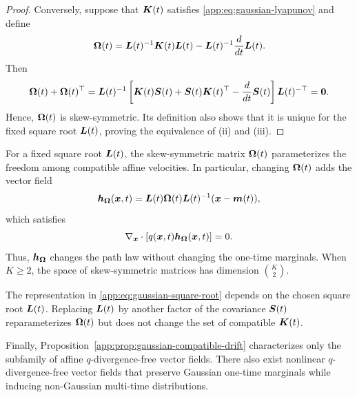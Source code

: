 \begin{proof}
Conversely, suppose that $\boldsymbol{K}(t)$ satisfies \eqref{app:eq:gaussian-lyapunov} and define
\begin{equation*}
    \boldsymbol{\Omega}(t) = \boldsymbol{L}(t)^{-1}\boldsymbol{K}(t)\boldsymbol{L}(t) - \boldsymbol{L}(t)^{-1}\frac{d}{d t}\boldsymbol{L}(t).
\end{equation*}
Then
\begin{equation*}
    \boldsymbol{\Omega}(t) + \boldsymbol{\Omega}(t)^\top  = \boldsymbol{L}(t)^{-1} \left[    \boldsymbol{K}(t)\boldsymbol{S}(t) + \boldsymbol{S}(t)\boldsymbol{K}(t)^\top - \frac{d}{d t}\boldsymbol{S}(t) \right] \boldsymbol{L}(t)^{-\top} =\boldsymbol{0}.
\end{equation*}
Hence, $\boldsymbol{\Omega}(t)$ is skew-symmetric. 
Its definition also shows that it is unique for the fixed square root $\boldsymbol{L}(t)$, proving the equivalence of (ii) and (iii).
\end{proof}

For a fixed square root $\boldsymbol{L}(t)$, the skew-symmetric matrix $\boldsymbol{\Omega}(t)$ parameterizes the
freedom among compatible affine velocities. In particular, changing $\boldsymbol{\Omega}(t)$ adds the vector
field
\begin{equation*}
    \boldsymbol{h}_{\boldsymbol{\Omega}}(\boldsymbol{x},t) =  \boldsymbol{L}(t)\boldsymbol{\Omega}(t)\boldsymbol{L}(t)^{-1}(\boldsymbol{x} - \boldsymbol{m}(t)),
\end{equation*}
which satisfies
\begin{equation*}
    \nabla_{\boldsymbol{x}}\cdot \left[ q(\boldsymbol{x},t)\boldsymbol{h}_{\boldsymbol{\Omega}}(\boldsymbol{x},t) \right] = 0.
\end{equation*}
Thus, $\boldsymbol{h}_{\boldsymbol{\Omega}}$ changes the path law without changing the one-time marginals. 
When $K\geq2$, the space of skew-symmetric matrices has dimension $\binom{K}{2}$.

The representation in \eqref{app:eq:gaussian-square-root} depends on the chosen square root $\boldsymbol{L}(t)$.
Replacing $\boldsymbol{L}(t)$ by another factor of the covariance $\boldsymbol{S}(t)$ reparameterizes $\boldsymbol{\Omega}(t)$ but does not change the set of compatible $\boldsymbol{K}(t)$.

Finally, Proposition~\ref{app:prop:gaussian-compatible-drift} characterizes only the subfamily of affine $q$-divergence-free vector fields. 
There also exist nonlinear $q$-divergence-free vector fields that preserve Gaussian one-time marginals while inducing non-Gaussian multi-time distributions.



